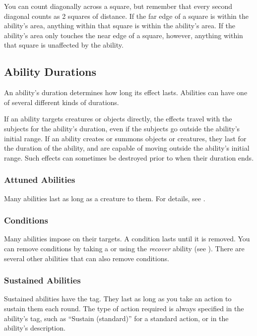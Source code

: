             You can count diagonally across a square, but remember that every second diagonal counts as 2 squares of distance.
            If the far edge of a square is within the ability's area, anything within that square is within the ability's area.
            If the ability's area only touches the near edge of a square, however, anything within that square is unaffected by the ability.

    \subsection{Ability Durations}\label{Ability Durations}

        An ability's duration determines how long its effect lasts.
        Abilities can have one of several different kinds of durations.

        If an ability targets creatures or objects directly, the effects travel with the subjects for the ability's duration, even if the subjects go outside the ability's initial range.
        If an ability creates or summons objects or creatures, they last for the duration of the ability, and are capable of moving outside the ability's initial range.
        Such effects can sometimes be destroyed prior to when their duration ends.

        \subsubsection{Attuned Abilities}
            Many abilities last as long as a creature  to them.
            For details, see .

        \subsubsection{Conditions}\label{Conditions}
            Many abilities impose  on their targets.
            A condition lasts until it is removed.
            You can remove conditions by taking a  or using the \textit{recover} ability (see ).
            There are several other abilities that can also remove conditions.

        \subsubsection{Sustained Abilities}\label{Sustained Abilities}
            Sustained abilities have the  tag.
            They last as long as you take an action to sustain them each round.
            The type of action required is always specified in the ability's tag, such as ``Sustain (standard)'' for a standard action, or in the ability's description.

